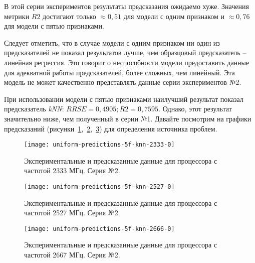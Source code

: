 В этой серии экспериментов результаты предсказания ожидаемо хуже. Значения метрики $R2$ достигают только $\approx 0,51$ для модели с одним признаком и $\approx 0,76$ для модели с пятью признаками.

Следует отметить, что в случае модели с одним признаком ни один из предсказателей не показал результатов лучше, чем образцовый предсказатель -- линейная регрессия. Это говорит о неспособности модели предоставить данные для адекватной работы предсказателей, более сложных, чем линейный. Эта модель не может качественно представлять данные серии экспериментов №2.

При использовании модели с пятью признаками наилучший результат показал предсказатель \textit{kNN}: $RRSE = 0,4905; R2 = 0,7595$. Однако, этот результат значительно ниже, чем полученный в серии №1. Давайте посмотрим на графики предсказаний (рисунки~\ref{img:uniform-predictions-5f-knn-2333-0},~\ref{img:uniform-predictions-5f-knn-2527-0},~\ref{img:uniform-predictions-5f-knn-2666-0}) для определения источника проблем.

\begin{figure}[H]
    \begin{center}
        \texttt{[image: uniform-predictions-5f-knn-2333-0]}
        \caption{Экспериментальные и предсказанные данные для процессора с частотой 2333 МГц. Серия №2.}
        \label{img:uniform-predictions-5f-knn-2333-0}
    \end{center}
\end{figure}

\begin{figure}[H]
    \begin{center}
        \texttt{[image: uniform-predictions-5f-knn-2527-0]}
        \caption{Экспериментальные и предсказанные данные для процессора с частотой 2527 МГц. Серия №2.}
        \label{img:uniform-predictions-5f-knn-2527-0}
    \end{center}
\end{figure}

\begin{figure}[H]
    \begin{center}
        \texttt{[image: uniform-predictions-5f-knn-2666-0]}
        \caption{Экспериментальные и предсказанные данные для процессора с частотой 2667 МГц. Серия №2.}
        \label{img:uniform-predictions-5f-knn-2666-0}
    \end{center}
\end{figure}

